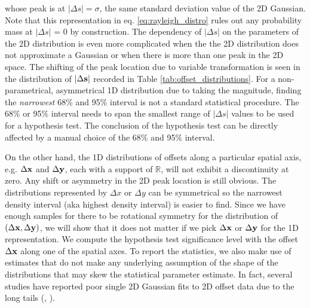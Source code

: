whose peak is at $|\Delta s| = \sigma$, the same standard deviation value of the 2D
Gaussian. Note that this representation in  
eq. \ref{eq:rayleigh_distro}
rules out any probability mass at $|\Delta s|$ = 0 by construction. 
The dependency of $|\Delta s|$ on the parameters of
the 2D distribution is even more
complicated when the the 2D distribution does not approximate a Gaussian 
or when there is more than one peak in the 2D space. 
The shifting of the peak location due to variable transformation 
is seen in the distribution of $|\Delta {\bf s}|$ recorded in Table
\ref{tab:offset_distributions}.
For a non-parametrical, asymmetrical 1D distribution due to taking the magnitude, 
finding the {\it narrowest} 68\% and 95\% interval
is not a standard statistical procedure. The 68\% or 95\% interval needs to
span the smallest range of $|\Delta s|$ values to be used for a hypothesis test.
The conclusion of the hypothesis test can be directly affected by 
a manual choice of the 68\% and 95\% interval.

On the other hand, 
the 1D distributions of offsets along a particular spatial axis, 
e.g. $\Delta {\bf x}$ and $\Delta {\bf y}$,
each with a support of $\mathbb{R}$, will not exhibit a discontinuity at zero.
Any shift or asymmetry in the 2D peak location is still obvious. 
The distributions represented by $\Delta x$ or $\Delta y$ 
can be symmetrical so 
the narrowest density interval (aka highest density interval) is easier to find.
Since we have enough samples for there to be
rotational symmetry for the distribution of $(\Delta {\bf x}, \Delta {\bf y})$,
we will show that it does not
matter if we pick $\Delta {\bf x}$ or $\Delta {\bf y}$ for the 1D representation.
We compute the hypothesis test significance level with the 
 offset $\Delta {\bf x}$ along one of the spatial axes. 
To report the statistics, we also make use of estimates that do not make any
underlying assumption of the shape of the distributions that may skew the
statistical parameter estimate.
In fact, several studies have reported poor single 2D Gaussian fits to 2D offset data
due to the long tails
(\citealt{Zitrin2012a}, \citealt{Oguri2010}).  

